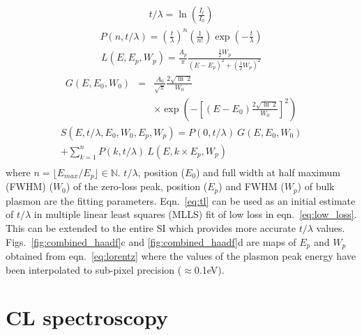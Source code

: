 \documentclass[%
 aip,
rsi,%
 amsmath,amssymb,
 reprint,%
]{revtex4-1}
\begin{document}
\begin{eqnarray}
	t/\lambda = \operatorname{ln}\left(\frac{I_t}{I_0}\right)
    \label{eq:tl}
\end{eqnarray}
\begin{eqnarray}
	P(n,t/\lambda) = \left(\frac{t}{\lambda}\right)^n\left(\frac{1}{n!}\right)\operatorname{exp}\left(-\frac{t}{\lambda}\right)
    \label{eq:poisson}
\end{eqnarray}
\begin{eqnarray}
	L(E,E_p,W_p) = \frac{A_p}{\pi} \frac{\frac{1}{2}W_p}{(E-E_p)^2+\left(\frac{1}{2}W_p\right)^2}
    \label{eq:lorentz}
\end{eqnarray}
\begin{eqnarray}
	G(E,E_0,W_0) &=& \frac{A_0}{\sqrt{\pi}}\frac{2\sqrt{\operatorname{ln}~2}}{W_0}\nonumber\\
    & & \times \operatorname{exp}\left(-\left[(E-E_0)\frac{2\sqrt{\operatorname{ln}~2}}{W_0}\right]^2\right)
    \label{eq:gauss}
\end{eqnarray}
\begin{eqnarray}
	S(E,t/\lambda,E_0,W_0,E_p,W_p) = P(0,t/\lambda)~G(E,E_0,W_0) \nonumber \\
     +\sum_{k=1}^{n}P(k,t/\lambda)~L(E,k\times E_p,W_p) \nonumber \\
    \label{eq:low_loss}
\end{eqnarray}
where $n = \lfloor E_{max}/E_p \rfloor \in \mathbb{N}$.  $t/\lambda$, position ($E_0$) and full width at half maximum (FWHM) ($W_0$) of the zero-loss peak, position ($E_p$) and FWHM ($W_p$) of bulk plasmon are the fitting parameters. Eqn.~\ref{eq:tl} can be used as an initial estimate of $t/\lambda$ in multiple linear least squares (MLLS) fit of low loss in eqn.~\ref{eq:low_loss}. This can be extended to the entire SI which provides more accurate $t/\lambda$ values. Figs.~\ref{fig:combined_haadf}c and \ref{fig:combined_haadf}d are maps of $E_p$ and $W_p$ obtained from eqn.~\ref{eq:lorentz} where the values of the plasmon peak energy have been interpolated to sub-pixel precision ($\approx$0.1eV).

\section{CL spectroscopy}
\label{sec:CLS}
\end{document}
